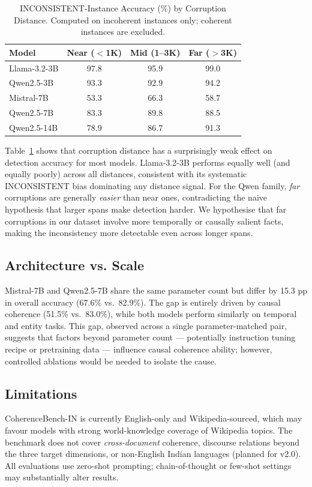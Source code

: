 \documentclass{llncs}
\begin{document}
\begin{table}[t]
\caption{INCONSISTENT-Instance Accuracy (\%) by Corruption Distance. Computed on incoherent instances only; coherent instances are excluded.}
\label{tab:distance_results}
\centering
\begin{tabular}{lccc}
\toprule
Model & Near ($<$1K) & Mid (1--3K) & Far ($>$3K) \\
\midrule
Llama-3.2-3B & 97.8 & 95.9 & 99.0 \\
Qwen2.5-3B & 93.3 & 92.9 & 94.2 \\
Mistral-7B & 53.3 & 66.3 & 58.7 \\
Qwen2.5-7B & 83.3 & 89.8 & 88.5 \\
Qwen2.5-14B & 78.9 & 86.7 & 91.3 \\
\bottomrule
\end{tabular}
\end{table}

Table~\ref{tab:distance_results} shows that corruption distance has
a surprisingly weak effect on detection accuracy for most models.
Llama-3.2-3B performs equally well (and equally poorly) across all distances,
consistent with its systematic INCONSISTENT bias dominating any distance signal.
For the Qwen family, \emph{far} corruptions are generally \emph{easier} than near ones,
contradicting the naive hypothesis that larger spans make detection harder.
We hypothesise that far corruptions in our dataset involve more temporally
or causally salient facts, making the inconsistency more detectable
even across longer spans.

\subsection{Architecture vs. Scale}
Mistral-7B and Qwen2.5-7B share the same parameter count but differ
by 15.3 pp in overall accuracy (67.6\% vs.\ 82.9\%).
The gap is entirely driven by causal coherence (51.5\% vs.\ 83.0\%),
while both models perform similarly on temporal and entity tasks.
This gap, observed across a single parameter-matched pair, suggests that factors beyond parameter count ---
potentially instruction tuning recipe or pretraining data ---
influence causal coherence ability; however, controlled ablations would be needed to isolate the cause.

\subsection{Limitations}
CoherenceBench-IN is currently English-only and Wikipedia-sourced,
which may favour models with strong world-knowledge coverage of Wikipedia topics.
The benchmark does not cover \emph{cross-document} coherence,
discourse relations beyond the three target dimensions,
or non-English Indian languages (planned for v2.0).
All evaluations use zero-shot prompting;
chain-of-thought or few-shot settings may substantially alter results.
\end{document}
